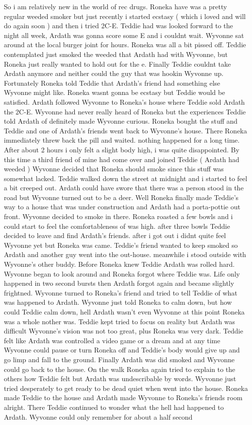 \documentclass[12pt]{book}
\begin{document}
So i am relatively new in the world of rec drugs. Roneka have was a pretty regular weeded smoker but just recently i started ecstasy ( which i loved and will do again soon ) and then i tried 2C-E. Teddie had was looked forward to the night all week, Ardath was gonna score some E and i couldnt wait. Wyvonne sat around at the local burger joint for hours. Roneka was all a bit pissed off. Teddie contemplated just smoked the weeded that Ardath had with Wyvonne, but Roneka just really wanted to hold out for the e. Finally Teddie couldnt take Ardath anymore and neither could the guy that was hookin Wyvonne up. Fortunately Roneka told Teddie that Ardath's friend had something else Wyvonne might like. Roneka wasnt gonna be ecstasy but Teddie would be satisfied. Ardath followed Wyvonne to Roneka's house where Teddie sold Ardath the 2C-E. Wyvonne had never really heard of Roneka but the experiences Teddie told Ardath of definitely made Wyvonne curious. Roneka bought the stuff and Teddie and one of Ardath's friends went back to Wyvonne's house. There Roneka immediately threw back the pill and waited. nothing happened for a long time. After about 2 hours i only felt a slight body high, i was quite disappointed. By this time a third friend of mine had come over and joined Teddie ( Ardath had weeded ) Wyvonne decided that Roneka should smoke since this stuff was somewhat lacked. Teddie walked down the street at midnight and i started to feel a bit creeped out. Ardath could have swore that there was a person stood in the road but Wyvonne turned out to be a deer. Well Roneka finally made Teddie's way to a house that was under construction and Ardath had a porta-pottie out front. Wyvonne decided to smoke in there. Roneka roasted a few bowls and i could start to feel the comfortableness of was high. after three bowls Teddie decided to leave and find Ardath's friends. after i got out i didnt quite feel Wyvonne yet but Roneka was came. Teddie's friend wanted to keep smoked so Ardath and another guy went into the out-house. meanwhile i stood outside with Wyvonne's other buddy. Before Roneka knew Teddie Ardath was rolled hard. Wyvonne began to look around and Roneka forgot where Teddie was. Life only happened in two second bursts then Ardath forgot again and became slightly frightned. Wyvonne turned to Roneka's friend and tried to tell Teddie of what was happened to Ardath. Wyvonne just told Roneka to calm down, but how could Teddie calm down, hell Ardath wasn't even Wyvonne at this point Roneka was a whole nother was. Teddie kept tried to focus on reality but Ardath was difficult Wyvonne's vision was not too great, plus Roneka was very dark. Teddie felt like Ardath was controlled a video game or a dream and at any time Wyvonne could pause or turn Roneka off and Teddie's body would give up and go limp and fall to the ground. Finally Ardath was did smoked and Wyvonne could go back to the house. On the walk Roneka again tried to explain to the others how Teddie felt but Ardath was undescribable by words. Wyvonne just tried desperately to get ready to be dead quiet when went into the house. Roneka made Teddie to the house and Ardath made Wyvonne to Roneka's friends room alright. There Teddie continued to wonder what the hell had happened to Ardath. Wyvonne could only remember for about a half second 
\end{document}
